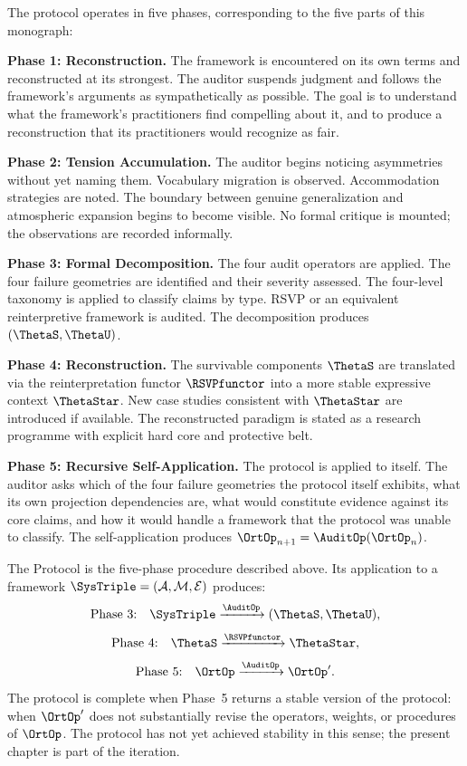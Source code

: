 The protocol operates in five phases, corresponding
to the five parts of this monograph:

\textbf{Phase 1: Reconstruction.} The framework is
encountered on its own terms and reconstructed at its
strongest. The auditor suspends judgment and follows
the framework's arguments as sympathetically as possible.
The goal is to understand what the framework's
practitioners find compelling about it, and to produce
a reconstruction that its practitioners would recognize
as fair.

\textbf{Phase 2: Tension Accumulation.} The auditor
begins noticing asymmetries without yet naming them.
Vocabulary migration is observed. Accommodation
strategies are noted. The boundary between genuine
generalization and atmospheric expansion begins to
become visible. No formal critique is mounted; the
observations are recorded informally.

\textbf{Phase 3: Formal Decomposition.} The four
audit operators are applied. The four failure geometries
are identified and their severity assessed. The four-level
taxonomy is applied to classify claims by type. RSVP
or an equivalent reinterpretive framework is audited.
The decomposition produces $(\ThetaS, \ThetaU)$.

\textbf{Phase 4: Reconstruction.} The survivable
components $\ThetaS$ are translated via the reinterpretation
functor $\RSVPfunctor$ into a more stable expressive
context $\ThetaStar$. New case studies consistent with
$\ThetaStar$ are introduced if available. The reconstructed
paradigm is stated as a research programme with explicit
hard core and protective belt.

\textbf{Phase 5: Recursive Self-Application.} The
protocol is applied to itself. The auditor asks which
of the four failure geometries the protocol itself
exhibits, what its own projection dependencies are,
what would constitute evidence against its core claims,
and how it would handle a framework that the protocol
was unable to classify. The self-application produces
$\OrtOp_{n+1} = \AuditOp(\OrtOp_n)$.

\begin{protocol}
\label{prot:ortyx}
The \Ortyx{} Protocol is the five-phase procedure
described above. Its application to a framework
$\SysTriple = (\mathcal{A}, \mathcal{M}, \mathcal{E})$
produces:
\[
  \text{Phase 3:}\quad
  \SysTriple \xrightarrow{\AuditOp} (\ThetaS, \ThetaU),
\]
\[
  \text{Phase 4:}\quad
  \ThetaS \xrightarrow{\RSVPfunctor} \ThetaStar,
\]
\[
  \text{Phase 5:}\quad
  \OrtOp \xrightarrow{\AuditOp} \OrtOp'.
\]
The protocol is complete when Phase~5 returns a stable
version of the protocol: when $\OrtOp'$ does not
substantially revise the operators, weights, or
procedures of $\OrtOp$. The protocol has not yet
achieved stability in this sense; the present chapter
is part of the iteration.
\end{protocol}

